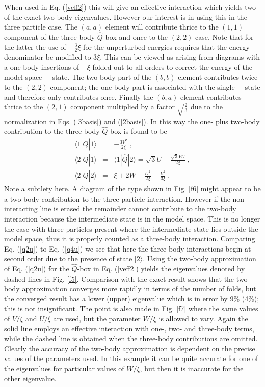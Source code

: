 \documentclass[prc,aps,amsmath,amssymb,preprintnumbers,showpacs,twocolumn]{revtex4}
\def\threehalf{{\textstyle{\frac{3}{2}}}}
\def\twothird{{\textstyle{\frac{2}{3}}}}
\begin{document}
%
When used in Eq. (\ref{veff2}) this will give an effective interaction which
yields two of the exact two-body eigenvalues.
However our interest is in using this in the three 
particle case. The $(a,a)$ element will contribute thrice to the
$(1,1)$ component of the three body $\hat{Q}$-box and once to the
$(2,2)$ case. Note that for the latter the use of  $-\threehalf\xi$
for the unperturbed energies requires that the energy denominator
be modified to $3\xi$. This can be viewed as arising from diagrams
with a one-body insertions of $-\xi$ folded out to all
orders to correct the energy of the model space $+$ state. 
The two-body part of the  $(b,b)$ element
contributes twice to the $(2,2)$ component; the one-body part is 
associated with the single $+$ state and therefore only contributes 
once. Finally the $(b,a)$ element contributes thrice to the $(2,1)$ 
component multiplied by a factor $\sqrt{\twothird}$ due to the 
normalization in 
Eqs. (\ref{3basis}) and (\ref{2basis}). In this way the one- plus 
two-body contribution to the three-body $\hat{Q}$-box is found to be
\begin{eqnarray}
\langle1|\hat{Q}|1\rangle&=&-\frac{3V^2}{2\xi}\;,\nonumber\\
\langle2|\hat{Q}|1\rangle&=&\langle1|\hat{Q}|2\rangle=\sqrt{3}U-
\frac{\sqrt{3}VU}{2\xi} \;,\nonumber\\
\langle2|\hat{Q}|2\rangle&=&\xi+2W-\frac{U^2}{2\xi}
-\frac{V^2}{3\xi}\;. \label{q2u}
\end{eqnarray}
Note a subtlety here. A diagram of the type shown in Fig. \ref{f6} 
might appear to be a two-body contribution to the three-particle 
interaction. However if the non-interacting line is erased the 
remainder cannot contribute to the two-body interaction because the 
intermediate state is in the model space. This is no longer the case 
with three particles present where the intermediate state lies outside 
the model space, thus it is properly counted as a three-body 
interaction. Comparing Eq. (\ref{q2u}) to Eq. (\ref{q4u}) we see that 
here the three-body interactions begin at second order due to the 
presence of state $|2\rangle$. 
Using the two-body approximation of Eq. (\ref{q2u}) for the $\hat{Q}$-box
in Eq. (\ref{veff2}) yields the eigenvalues denoted by dashed lines 
in Fig. \ref{f5}. Comparison with the exact result shows that the two-body 
approximation converges more rapidly in terms of the number of folds, 
but the converged result has a lower (upper) eigenvalue which is in error
by 9\% (4\%); this is not insignificant. The point is also made 
in Fig. \ref{f7} where the same values of $V/\xi$ and $U/\xi$ are used,
but the parameter $W/\xi$ is allowed to vary. Again the solid line
employs an effective interaction with one-, two- and %
three-body terms, while the dashed line is obtained when the three-body 
contributions are omitted. 
Clearly the accuracy of the two-body approximation is dependent on 
the precise values of the parameters used. In this example it can be 
quite accurate for one of the eigenvalues for particular values
of $W/\xi$, but then it is inaccurate for the other eigenvalue.
\end{document}
